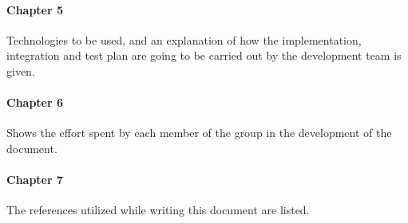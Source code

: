 \paragraph{Chapter 5} Technologies to be used, and an explanation of how the implementation, integration and test plan are going to be carried out by the development team is given.

\paragraph{Chapter 6} Shows the effort spent by each member of the group in the development of the document.

\paragraph{Chapter 7} The references utilized while writing this document are listed.